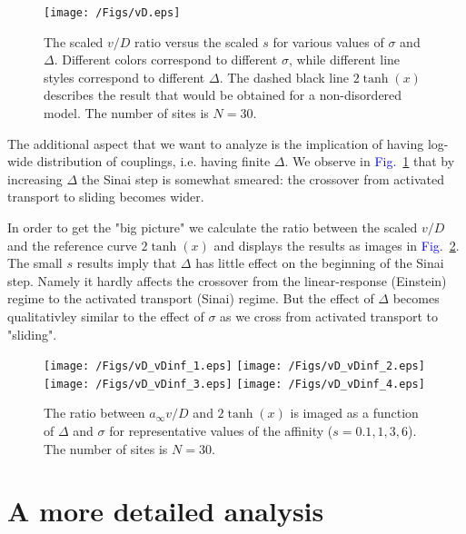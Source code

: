 \documentclass[aps,pre,floats,floatfix,fleqn,notitlepage]{revtex4-1}
\newcommand{\Fig}[1] {\textcolor{blue}{Fig.~\ref{#1}}} %
\begin{document}
\begin{figure}[h]
\texttt{[image: /Figs/vD.eps]}

\caption{The scaled $v/D$ ratio versus the scaled $s$ for various values of $\sigma$ and $\Delta$.
Different colors correspond to different $\sigma$,  
while different line styles correspond to different $\Delta$. 
The dashed black line $2\tanh(x)$ describes the result 
that would be obtained for a non-disordered model. The number of sites is $N=30$. 
}
\label{fig2}
\end{figure}


The additional aspect that we want to analyze is the implication 
of having log-wide distribution of couplings, i.e. having finite $\Delta$.
We observe in  \Fig{fig2} that by increasing $\Delta$ 
the Sinai step is somewhat smeared: the crossover from 
activated transport to sliding becomes wider.

In order to get the "big picture" we calculate the ratio between the scaled $v/D$ 
and the reference curve $2\tanh(x)$ and displays the results as images in \Fig{fig3a}.  
The small $s$ results imply that $\Delta$ has little effect on the 
beginning of the Sinai step. Namely it hardly affects the crossover 
from the linear-response (Einstein) regime to the activated transport (Sinai) regime. 
But the effect of $\Delta$ becomes qualitativley similar 
to the effect of $\sigma$ as we cross from activated transport to "sliding".  


\begin{figure}[h]

\texttt{[image: /Figs/vD\_vDinf\_1.eps]}
\texttt{[image: /Figs/vD\_vDinf\_2.eps]}
\texttt{[image: /Figs/vD\_vDinf\_3.eps]}
\texttt{[image: /Figs/vD\_vDinf\_4.eps]}

\caption{
The ratio between $a_{\infty} v/D$ and $2\tanh(x)$ is imaged 
as a function of $\Delta$ and $\sigma$ for representative 
values of the affinity (${s=0.1,1,3,6}$). The number of sites is $N=30$.}
\label{fig3a}
\end{figure}


\section{A more detailed analysis}
\end{document}
